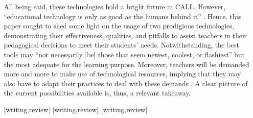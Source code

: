 \documentclass[english]{textolivre}
\begin{document}
All being said, these technologies hold a bright future in CALL. However, “educational technology is only as good as the humans behind it” \cite[p. 201]{rogerson-revell2021}. Hence, this paper sought to shed some light on the usage of two prodigious technologies, demonstrating their effectiveness, qualities, and pitfalls to assist teachers in their pedagogical decisions to meet their students’ needs. Notwithstanding, the best tools may “not necessarily [be] those that seem newest, coolest, or ﬂashiest” \cite[p. 209]{yoshida2018} but the most adequate for the learning purpose. Moreover, teachers will be demanded more and more to make use of technological resources, implying that they may also have to adapt their practices to deal with these demands \cite{menezes2019}. A clear picture of the current possibilities available is, thus, a relevant takeaway.

\printbibliography\label{sec-bib}


\begin{contributors}
[writing,review]
[writing,review]
[writing,review]
\end{contributors}
\end{document}
